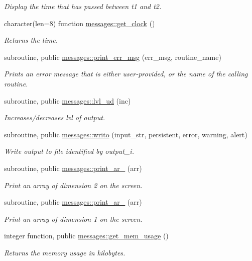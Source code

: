 \begin{DoxyCompactItemize}
\begin{DoxyCompactList}\small\item\em Display the time that has passed between {\ttfamily t1} and {\ttfamily t2}. \end{DoxyCompactList}\item 
character(len=8) function \hyperlink{namespacemessages_a61fd0b51b5e37d58fdc993c01792a3fd}{messages\+::get\+\_\+clock} ()
\begin{DoxyCompactList}\small\item\em Returns the time. \end{DoxyCompactList}\item 
subroutine, public \hyperlink{namespacemessages_a0da9248828de8b7480b99b47618e8310}{messages\+::print\+\_\+err\+\_\+msg} (err\+\_\+msg, routine\+\_\+name)
\begin{DoxyCompactList}\small\item\em Prints an error message that is either user-\/provided, or the name of the calling routine. \end{DoxyCompactList}\item 
subroutine, public \hyperlink{namespacemessages_a6e6bfb084063e4cc91ee86e542043302}{messages\+::lvl\+\_\+ud} (inc)
\begin{DoxyCompactList}\small\item\em Increases/decreases {\ttfamily lvl} of output. \end{DoxyCompactList}\item 
subroutine, public \hyperlink{namespacemessages_aa4a8d01563e92558e8a0875b075ec54c}{messages\+::writo} (input\+\_\+str, persistent, error, warning, alert)
\begin{DoxyCompactList}\small\item\em Write output to file identified by {\ttfamily output\+\_\+i}. \end{DoxyCompactList}\item 
subroutine, public \hyperlink{namespacemessages_a80797cedef6112b8dccaeda431f0c610}{messages\+::print\+\_\+ar\+\_} (arr)
\begin{DoxyCompactList}\small\item\em Print an array of dimension 2 on the screen. \end{DoxyCompactList}\item 
subroutine, public \hyperlink{namespacemessages_a5686118397930f505259225f3688216b}{messages\+::print\+\_\+ar\+\_} (arr)
\begin{DoxyCompactList}\small\item\em Print an array of dimension 1 on the screen. \end{DoxyCompactList}\item 
integer function, public \hyperlink{namespacemessages_a82dddaab795b78b3d39e1ff1aab2f665}{messages\+::get\+\_\+mem\+\_\+usage} ()
\begin{DoxyCompactList}\small\item\em Returns the memory usage in kilobytes. \end{DoxyCompactList}\end{DoxyCompactItemize}
